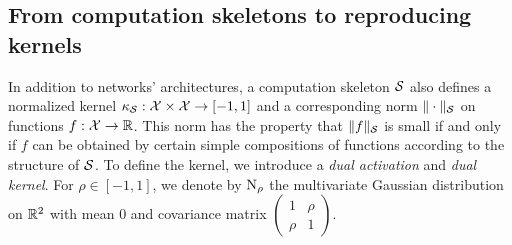 \subsection{From computation skeletons to reproducing kernels}
%
In addition to networks' architectures, a computation skeleton ${\cal S}$ also
defines a normalized kernel $\kappa_{\cal S}:{\cal X}\times{\cal X}\to[-1,1]$ and a
corresponding norm $\|\cdot \|_{{\cal S}}$ on functions $f:{\cal X}\to{\mathbb R}$. This
norm has the property that $\|f\|_{{\cal S}}$ is small if and only if $f$ can be
obtained by certain simple compositions of functions according to the
structure of ${\cal S}$. To define the kernel,
we introduce a {\em dual activation} and {\em dual kernel}. For
$\rho\in[-1,1]$, we denote by $\text{N}_\rho$ the multivariate Gaussian
distribution on ${\mathbb R}^2$ with mean $0$ and covariance matrix
$\left( \begin{smallmatrix} 1 & \rho \\ \rho & 1 \end{smallmatrix} \right)$.
%

